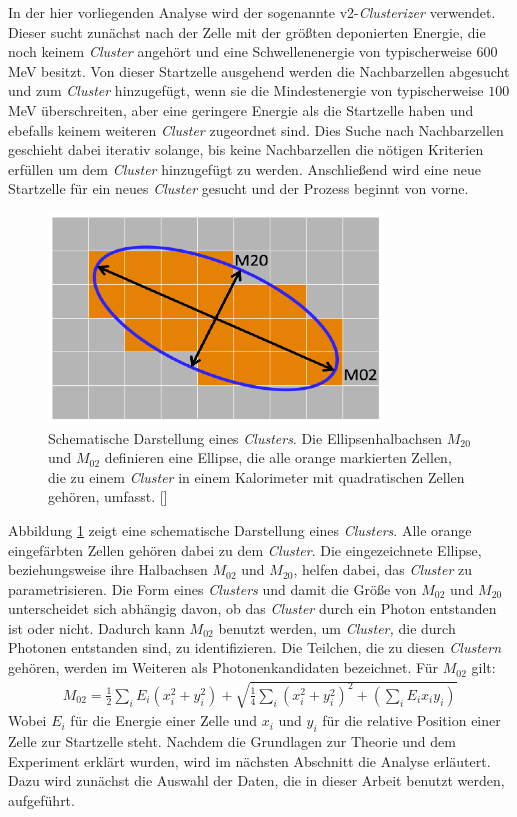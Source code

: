 In der hier vorliegenden Analyse wird der sogenannte v2-\textit{Clusterizer} verwendet.
Dieser sucht zunächst nach der Zelle mit der größten deponierten Energie, die noch keinem \textit{Cluster} angehört und eine Schwellenenergie von typischerweise $600$ MeV besitzt.
Von dieser Startzelle ausgehend werden die Nachbarzellen abgesucht und zum \textit{Cluster} hinzugefügt, wenn sie die Mindestenergie von typischerweise $100$ MeV überschreiten, aber eine geringere Energie als die Startzelle haben und ebefalls keinem weiteren \textit{Cluster} zugeordnet sind.
Dies Suche nach Nachbarzellen geschieht dabei iterativ solange, bis keine Nachbarzellen die nötigen Kriterien erfüllen um dem \textit{Cluster} hinzugefügt zu werden.
Anschließend wird eine neue Startzelle für ein neues \textit{Cluster} gesucht und der Prozess beginnt von vorne.
\begin{figure}[t!]
\centering
\includegraphics[width=.35\linewidth]{m02&m20.png}
\caption{Schematische Darstellung eines \textit{Clusters}. Die Ellipsenhalbachsen $M_{20}$ und $M_{02}$ definieren eine Ellipse, die alle orange markierten Zellen, die zu einem \textit{Cluster} in einem Kalorimeter mit quadratischen Zellen gehören, umfasst.
[\cite{thesis:Adrian}]}
\label{fig:$M_{20}$}
\end{figure}
Abbildung \ref{fig:$M_{20}$} zeigt eine schematische Darstellung eines \textit{Clusters}.
Alle orange eingefärbten Zellen gehören dabei zu dem \textit{Cluster}.
Die eingezeichnete Ellipse, beziehungsweise ihre Halbachsen $M_{02}$ und $M_{20}$, helfen dabei, das \textit{Cluster} zu parametrisieren.
Die Form eines \textit{Clusters} und damit die Größe von $M_{02}$ und $M_{20}$ unterscheidet sich abhängig davon, ob das \textit{Cluster} durch ein Photon entstanden ist oder nicht.
Dadurch kann $M_{02}$ benutzt werden, um \textit{Cluster,} die durch Photonen entstanden sind, zu identifizieren.
Die Teilchen, die zu diesen \textit{Clustern} gehören, werden im Weiteren als Photonenkandidaten bezeichnet.
Für $M_{02}$ gilt:
\begin{align} 
M_{02} = \frac{1}{2}\sum_{i}E_{i}(x_{i}^{2}+y_{i}^{2})+\sqrt{\frac{1}{4}\sum_{i}\left(x_{i}^{2}+y_{i}^{2}\right)^{2}+\left(\sum_{i}E_{i}x_{i}y_{i}\right)}
\end{align}
Wobei $E_{i}$ für die Energie einer Zelle und $x_{i}$ und $y_{i}$ für die relative Position einer Zelle zur Startzelle steht.
\newline
Nachdem die Grundlagen zur Theorie und dem Experiment erklärt wurden, wird im nächsten Abschnitt die Analyse erläutert.
Dazu wird zunächst die Auswahl der Daten, die in dieser Arbeit benutzt werden, aufgeführt.